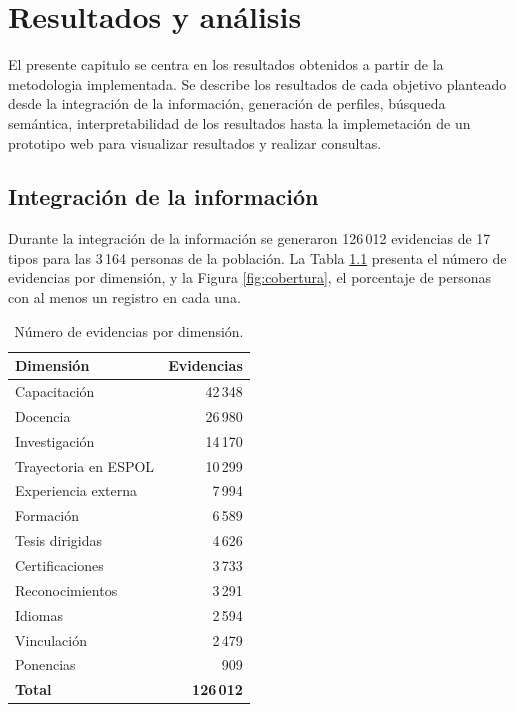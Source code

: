 \chapter{Resultados y análisis}
\label{chapter:resultados}

El presente capitulo se centra en los resultados obtenidos a partir de la metodologia implementada. Se describe los resultados de cada objetivo planteado desde la integración de la información, generación de perfiles, búsqueda semántica, interpretabilidad de los resultados hasta la implemetación de un prototipo web para visualizar resultados y realizar consultas.

\section{Integración de la información}
\label{sec:res_integracion}



Durante la integración de la información se generaron 126\,012 evidencias de 17 tipos para las 3\,164 personas de la población. La Tabla \ref{tab:evidencias_dimension} presenta el número de evidencias por dimensión, y la Figura \ref{fig:cobertura}, el porcentaje de personas con al menos un registro en cada una.

\begin{table}[!htbp]
    \centering
    \caption{Número de evidencias por dimensión.}
    \label{tab:evidencias_dimension}
    \small
    \begin{tabular}{l r}
        \toprule
        \textbf{Dimensión} & \textbf{Evidencias} \\
        \midrule
        Capacitación & 42\,348 \\
        Docencia & 26\,980 \\
        Investigación & 14\,170 \\
        Trayectoria en ESPOL & 10\,299 \\
        Experiencia externa & 7\,994 \\
        Formación & 6\,589 \\
        Tesis dirigidas & 4\,626 \\
        Certificaciones & 3\,733 \\
        Reconocimientos & 3\,291 \\
        Idiomas & 2\,594 \\
        Vinculación & 2\,479 \\
        Ponencias & 909 \\
        \midrule
        \textbf{Total} & \textbf{126\,012} \\
        \bottomrule
    \end{tabular}
\end{table}

